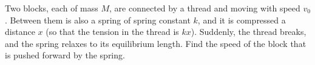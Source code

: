 Two blocks, each of mass $M$, are connected by a thread and
moving with speed $v_0$. Between them is also a spring of spring constant
$k$, and it is compressed a distance $x$ (so that the tension in the
thread is $kx$). Suddenly, the thread breaks, and the spring relaxes
to its equilibrium length. Find the speed of the block that is pushed forward
by the spring.

